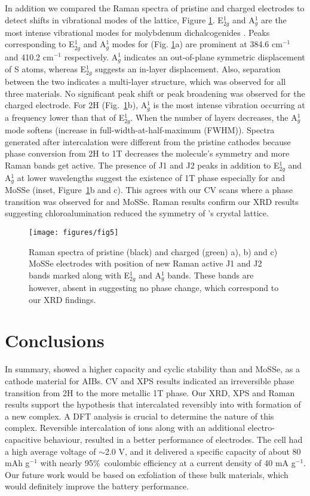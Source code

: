 In addition we compared the Raman spectra of pristine and charged electrodes to detect shifts in vibrational modes of the lattice, Figure \ref{figures/fig5}. E$^1_{2g}$ and A$^1_g$ are the most intense vibrational modes for molybdenum dichalcogenides \cite{yang_pressure-induced_2019, r_2d_2017,sharma_stable_2018}. Peaks corresponding to E$^1_{2g}$ and A$^1_g$ modes for  (Fig. \ref{figures/fig5}a) are prominent at 384.6 cm$^{-1}$ and 410.2 cm$^{-1}$ respectively. A$^1_g$ indicates an out-of-plane symmetric displacement of S atoms, whereas E$^1_{2g}$ suggests an in-layer displacement. Also, separation between the two indicates a multi-layer structure, which was observed for all three materials. No significant peak shift or peak broadening was observed for the charged  electrode. For 2H (Fig.\ \ref{figures/fig5}b), A$^1_g$ is the most intense vibration occurring at a frequency lower than that of E$^1_{2g}$. When the number of layers decreases, the A$^1_g$ mode softens (increase in full-width-at-half-maximum (FWHM)). Spectra generated after intercalation were different from the pristine cathodes because phase conversion from 2H to 1T decreases the molecule's symmetry and more Raman bands get active. The presence of J1 and J2 peaks in addition to E$^1_{2g}$ and A$^1_g$ at lower wavelengths suggest the existence of 1T phase especially for  and MoSSe (inset, Figure\ \ref{figures/fig5}b and c). This agrees with our CV scans where a phase transition was observed for  and MoSSe. Raman results confirm our XRD results suggesting chloroalumination reduced the symmetry of 's crystal lattice. 
\begin{figure}[htb!]
\centering
\texttt{[image: figures/fig5]}
\caption{Raman spectra of pristine (black) and charged (green) a), b)  and c) MoSSe electrodes with position of new Raman active J1 and J2 bands marked along with E$^1_{2g}$ and A$^1_g$ bands. These bands are however, absent in  suggesting no phase change, which correspond to our XRD findings.}
\label{figures/fig5}
\end{figure}
\section{Conclusions}
In summary,  showed a higher capacity and cyclic stability than  and MoSSe, as a cathode material for AIBs. CV and XPS results indicated an irreversible phase transition from 2H to the more metallic 1T phase. Our XRD, XPS and Raman results support the hypothesis that  intercalated reversibly into  with formation of a new complex. A DFT analysis is crucial to determine the nature of this complex. Reversible intercalation of ions along with an additional electro-capacitive behaviour, resulted in a better performance of  electrodes. The cell had a high average voltage of $\sim$2.0 V, and it delivered a specific capacity of about 80 mAh g$^{-1}$ with nearly 95\%\ coulombic efficiency at a current density of 40 mA g$^{-1}$. Our future work would be based on exfoliation of these bulk materials, which would definitely improve the battery performance. 
